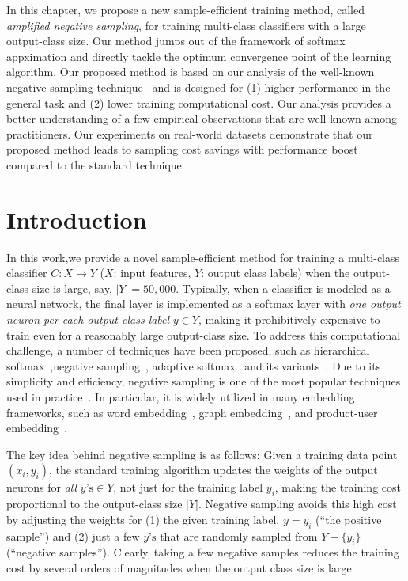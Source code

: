 In this chapter, we propose a new sample-efficient training method, called \emph{amplified negative sampling}, for training multi-class classifiers with a large output-class size. Our method jumps out of the framework of softmax appximation and directly tackle the optimum convergence point of the learning algorithm. Our proposed method is based on our  analysis of the well-known negative sampling technique~\citep{mikolov2013distributed} and is designed for (1) higher performance in the general task and (2) lower training computational cost. Our  analysis  provides a better understanding of a few empirical observations that are well known among practitioners. Our experiments on real-world datasets demonstrate that our proposed method leads to sampling cost savings with performance boost compared to the standard technique.

\section{Introduction}

In this work,we provide a novel sample-efficient method for training a multi-class classifier $C: X \rightarrow Y$ ($X$: input features, $Y$: output class labels) when the output-class size is large, say, $\vert Y \vert = 50,000$. Typically, when a classifier is modeled as a neural network, the final layer is implemented as a softmax layer with \emph{one output neuron per each output class label} $y \in Y$, making it prohibitively expensive to train even for a reasonably large output-class size. To address this computational challenge, a number of techniques have been proposed, such as hierarchical softmax~\citep{morin2005hierarchical},negative sampling~\citep{mikolov2013efficient}, adaptive softmax~\citep{bengio2008adaptive} and its variants~\citep{rawat2019sampled,blanc2017adaptive,grave2017efficient,chen2015strategies,bai2017tapas}. Due to its simplicity and efficiency, negative sampling is one of the most popular techniques used in practice~\citep{mikolov2013distributed,wang2017knowledge,node2vec-kdd2016,barkan2016item2vec}. In particular, it is widely utilized in many embedding frameworks, such as word embedding~\citep{mikolov2013distributed}, graph embedding~\citep{node2vec-kdd2016,wang2017knowledge}, and product-user embedding~\citep{barkan2016item2vec}.


The key idea behind negative sampling is as follows: Given a training data point $(x_i, y_i)$, the standard training algorithm updates the weights of the output neurons for \emph{all} $y\text{'s} \in Y$, not just for the training label $y_i$, making the training cost proportional to the output-class size $\vert Y \vert$. Negative sampling avoids this high cost by adjusting the weights for (1) the given training label, $y = y_i$ (``the positive sample'') and (2) just a few $y\text{'s}$ that are randomly sampled from $Y - \{y_i\}$ (``negative samples''). Clearly, taking a few negative samples reduces the training cost by several orders of magnitudes when the output class size is large. 

